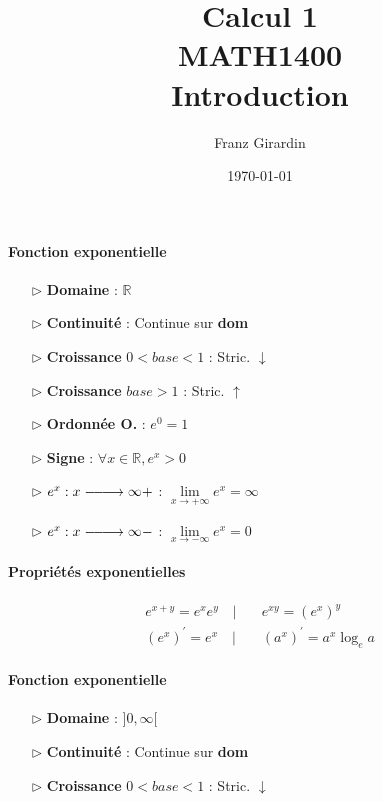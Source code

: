 \documentclass[2pt]{report}
\title{\Huge{Calcul 1}\\{MATH1400}\\{\textbf{Introduction}}}
\author{\huge{Franz Girardin}}
\date{\today}
\DeclareRobustCommand{\looongrightarrow}{%
  \DOTSB\relbar\joinrel\relbar\joinrel\relbar\joinrel\rightarrow
}
\begin{document}
\maketitle

\pagebreak

\pagebreak
\begin{multicols*}{3}

    \paragraph{Fonction exponentielle}
    \begin{itemize}
        \item[$\rhd$]  \textbf{Domaine} : $\mathbb{R}$  
        \item[$\rhd$]  \textbf{Continuité} : Continue sur \textbf{dom} 
        \item[$\rhd$]  \textbf{Croissance}  $0 < base < 1$ : 
            Stric. $\downarrow$

        \item[$\rhd$]  \textbf{Croissance}  $base > 1$ : Stric. $\uparrow$
        \item[$\rhd$]  \textbf{Ordonnée O.} : $e^0 = 1$   
        \item[$\rhd$]  \textbf{Signe} : $\forall x \in \mathbb{R}, e^x > 0$  
        \item[$\rhd$]   $e^x : x\looongrightarrow\infty+$ :  
            $\lim\limits_{x\to+\infty}e^x  = \infty$  
            \item[$\rhd$]   $e^x : x\looongrightarrow\infty-$ :  
                $\lim\limits_{x\to-\infty}e^x  = 0$
    \end{itemize}


\paragraph{Propriétés exponentielles}  
\begin{align*}
      e^{x+y} = e^{x}e^{y} \quad |& \quad e^{xy} = (e^{x})^{y} \\
      (e^x)^{\prime} = e^x \quad | & \quad (a^x)^{\prime} = a^x\log_ea
\end{align*}


    \paragraph{Fonction exponentielle}
    \begin{itemize}
        \item[$\rhd$]  \textbf{Domaine} : $]0, \infty [$  
        \item[$\rhd$]  \textbf{Continuité} : Continue sur \textbf{dom} 
        \item[$\rhd$]  \textbf{Croissance}  $0 < base < 1$ : 
            Stric. $\downarrow$


\end{itemize}
\end{multicols*}
\end{document}
